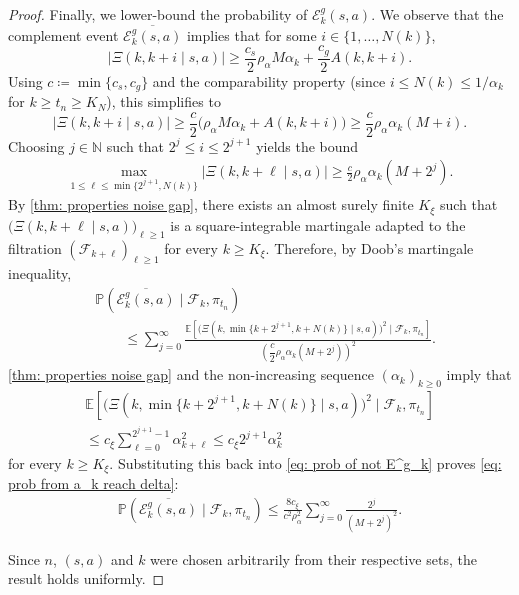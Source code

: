\begin{proof}
Finally, we lower-bound the probability of $\mathcal E^g_k(s,a)$.
We observe that the complement event $\overline{\mathcal E^g_k(s,a)}$ implies that for some $i \in \{1, \dots , N(k) \}$,
\[
\bigl| \Xi(k,k+i \mid s,a) \bigr|
\ge \frac{c_s}{2} \rho_\alpha M \alpha_k + \frac{c_g}{2} A(k,k+i) .
\]
Using $c \coloneqq \min\{c_s,c_g\}$ and the comparability property (since $i \le N(k) \le 1/\alpha_k$ for $k \ge t_n \ge K_N$), this simplifies to
\[
\bigl| \Xi(k,k+i \mid s,a) \bigr|
\ge \frac{c}{2} \big( \rho_\alpha M \alpha_k + A(k,k+i) \big)
\ge \frac{c}{2} \rho_\alpha \alpha_k ( M + i ).
\]
Choosing $j \in \mathbb N$ such that $2^j \le i \le 2^{j+1}$ yields the bound
\begin{align}
    \max_{1 \le \ell \le \min\{ 2^{j+1} , N(k)\}}
    |\Xi(k,k + \ell \mid s,a)|
    \ge \frac{c}{2} \rho_\alpha \alpha_k (M + 2^j) .
\end{align}
By \autoref{thm: properties noise gap}, there exists an almost surely finite $K_\xi$ such that $\big(\Xi(k, k+\ell \mid s,a)\big)_{\ell \ge 1}$ is a square-integrable martingale adapted to the filtration $(\mathcal F_{k+\ell})_{\ell \ge 1}$ for every $k \ge K_\xi$. Therefore, by Doob's martingale inequality,
\begin{align}
\label{eq: prob of not E^g_k}
    &\mathbb P
    \left( 
    \overline{\mathcal E^g_k(s,a)} \mid \mathcal F_{k}, \pi_{t_n}
    \right)
    \\
    \nonumber
    &\qquad \le
    \sum_{j = 0}^{\infty} \frac{\mathbb E \left[ \big( \Xi(k, \min\{ k+2^{j+1} , k+N(k) \} \mid s,a) \big)^2 \mid \mathcal F_{k}, \pi_{t_n} \right]}{\left( \dfrac{c}{2} \rho_\alpha \alpha_k ( M + 2^j) \right)^2} .
\end{align}
\autoref{thm: properties noise gap} and the non-increasing sequence $(\alpha_k)_{k \ge 0}$ imply that
\begin{multline*}
\mathbb E \left[ \big( \Xi(k, \min \{ k+2^{j+1} , k+N(k) \} \mid s,a) \big)^2 \mid \mathcal F_{k}, \pi_{t_n} \right]
\\
\le
c_\xi \sum_{\ell=0}^{2^{j+1}-1} \alpha^2_{k+\ell}
\le
c_\xi 2^{j+1} \alpha^2_k
\end{multline*}
for every $k \ge K_\xi$.
Substituting this back into \eqref{eq: prob of not E^g_k} proves \eqref{eq: prob from a_k reach delta}:
\begin{align}
    \mathbb P
    \left( 
    \overline{\mathcal E^g_k(s,a)} \mid \mathcal F_{k}, \pi_{t_n}
    \right)
    \le
    \frac{8 c_\xi}{c^2 \rho_\alpha^2} \sum_{j = 0}^{\infty} \frac{2^j}{(M+ 2^j)^2}.
\end{align}

Since $n$, $(s,a)$ and $k$ were chosen arbitrarily from their respective sets, the result holds uniformly.
\end{proof}

